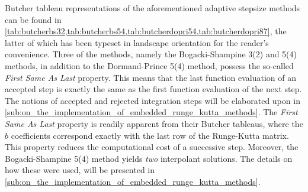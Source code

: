 Butcher tableau representations of the aforementioned adaptive stepsize methods
can be found in
\cref{tab:butcherbs32,tab:butcherbs54,tab:butcherdopri54,tab:butcherdopri87},
the latter of which has been typeset in landscape orientation for the reader's
convenience. Three of the methods, namely the Bogacki-Shampine 3(2) and 5(4)
methods, in addition to the Dormand-Prince 5(4) method, possess the so-called
\emph{First Same As Last} property. This means that the last function evaluation
of an accepted step is exactly the same as the first function evaluation of the
next step. The notions of accepted and rejected integration steps will be
elaborated upon in
\cref{sub:on_the_implementation_of_embedded_runge_kutta_methods}. The
\emph{First Same As Last} property is readily apparent from their Butcher
tableaus, where the $b$ coefficients correspond exactly with the last row of the
Runge-Kutta matrix. This property reduces the computational cost of a successive
step. Moreover, the Bogacki-Shampine 5(4) method yields \emph{two} interpolant
solutions. The details on how these were used, will be presented in
\cref{sub:on_the_implementation_of_embedded_runge_kutta_methods}.








\clearpage

